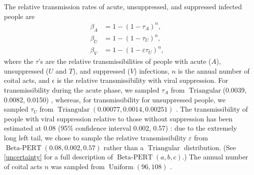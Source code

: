 \documentclass{article}
\DeclareMathOperator{\Uniform}{Uniform}
\DeclareMathOperator{\Triangular}{Triangular}
\DeclareMathOperator{\BetaPERT}{Beta-PERT}
\begin{document}
The relative transmission rates of acute, unsuppressed, and suppressed
infected people are
\begin{equation}
  \label{betas}
  \begin{split}
    \beta_A &= 1 - (1 - \tau_A)^n,
    \\
    \beta_U &= 1 - (1 - \tau_U)^n,
    \\
    \beta_V &= 1 - (1 - \varepsilon \tau_U)^n,
  \end{split}
\end{equation}
where the $\tau$'s are the relative transmissibilities of people with
acute ($A$), unsuppressed ($U$ and $T$), and suppressed ($V$)
infections, $n$ is the annual number of coital acts, and $\epsilon$ is the
relative transmissibility with viral suppression.  For
transmissibility during the acute phase, we sampled $\tau_A$ from
$\Triangular$(0.0039, 0.0082, 0.0150)
\cite{Wawer2005-us, Skarbinski2015-ni}, whereas, for transmissibility
for unsuppressed people, we sampled $\tau_U$ from
$\Triangular(0.00077, 0.0014, 0.00251)$ \cite{Hughes2012-so}.  The
transmissibility of people with viral suppression relative to those
without suppression has been estimated at 0.08 (95\% confidence
interval 0.002, 0.57) \cite{Donnell2010-xo}: due to the extremely
long left tail, we chose to sample the relative transmissibility
$\varepsilon$ from $\BetaPERT(0.08, 0.002, 0.57)$ rather than a
$\Triangular$ distribution.  (See \autoref{uncertainty} for a full
description of $\BetaPERT(a, b, c)$.)  The annual number of coital
acts $n$ was sampled from $\Uniform(96, 108)$
\cite{Wawer2005-us, Abdool_Karim2010-cm}.
\end{document}

